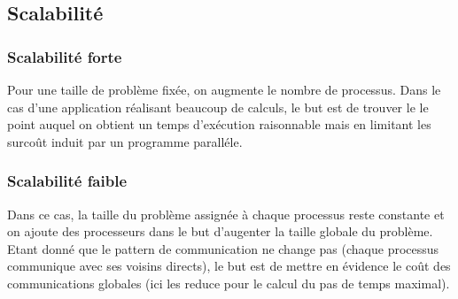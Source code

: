 
\subsection{Scalabilité}

\subsubsection{Scalabilité forte}
Pour une taille de problème fixée, on augmente le nombre de processus. Dans le cas d'une application réalisant beaucoup de calculs, le but est de trouver le le point auquel on obtient un temps d'exécution raisonnable mais en limitant les surcoût induit par un programme paralléle. 	

\subsubsection{Scalabilité faible}
Dans ce cas, la taille du problème assignée à chaque processus reste constante et on ajoute des processeurs dans le but d'augenter la taille globale du problème. Etant donné que le pattern de communication ne change pas (chaque processus communique avec ses voisins directs), le but est de mettre en évidence le coût des communications globales (ici les reduce pour le calcul du pas de temps maximal).







